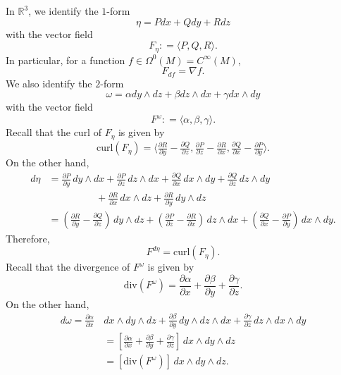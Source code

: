 \documentclass{ximera}
\begin{document}
\begin{example}
In $\mathbb{R}^3$, we identify the $1$-form
\[  \eta =   P   dx +  Q  dy + R   dz       \]
with the vector field 
\[  F_{\eta} : =   \langle P, Q, R \rangle    .  \]
In particular, for a function $f \in \Omega ^0 (M) = C^{\infty}(M)$,  
\[   F_{df}  = \nabla f .               \]
We also identify the $2$-form
\[  \omega =  \alpha dy \wedge dz  + \beta dz \wedge dx  + \gamma dx \wedge dy                        \]
with the vector field 
\[   F^{\omega} :  = \langle \alpha  , \beta , \gamma \rangle   .      \]
Recall that the curl of $F_{\eta}$ is given by 
\[    \text{curl} (F_{\eta}) = \langle \tfrac{\partial R}{\partial y} - \tfrac{\partial Q}{\partial z} , \tfrac{\partial P}{\partial z} - \tfrac{\partial R}{\partial x} , \tfrac{\partial Q}{\partial x}  - \tfrac{\partial P}{\partial y} \rangle .          \]
On the other hand, 
\begin{align*}
     d \eta & = \tfrac{\partial P }{\partial y}  \, dy \wedge dx + \tfrac{\partial P }{\partial z} \, dz \wedge dx  + \tfrac{\partial Q }{\partial x} \, dx \wedge dy + \tfrac{\partial Q }{\partial z} \, dz \wedge dy   \\
     &  \,\,\,\,\,\,\,\,\,\,\,\,\,\,\,\,\,\,\,\,\,\,\,\,\,\,\,\,\,     + \tfrac{\partial R }{\partial x} \, dx \wedge dz  + \tfrac{\partial R }{\partial y} \, dy \wedge dz \\
     & = \left(  \tfrac{\partial R }{\partial y} -  \tfrac{\partial Q }{\partial z}  \right) \, dy \wedge dz + \left(  \tfrac{\partial P }{\partial z} -  \tfrac{\partial R }{\partial x}  \right)\, dz \wedge dx + \left(  \tfrac{\partial Q }{\partial x} -  \tfrac{\partial P }{\partial y}  \right)\, dx \wedge dy  .
\end{align*}
Therefore, 
\[    F^{d \eta } = \text{curl}(F_{\eta}).                      \]
Recall that the divergence of $F^{\omega}$ is given by 
\[     \text{div} (F^{\omega}) =  \frac{\partial \alpha}{\partial x} +   \frac{\partial \beta }{\partial y }  +  \frac{\partial \gamma }{\partial z}    .            \]
On the other hand, 
\begin{align*}
    d \omega   = \frac{\partial \alpha}{\partial x } \, & dx \wedge dy \wedge dz + \frac{\partial \beta }{\partial y } \, dy \wedge dz \wedge dx +\frac{\partial \gamma }{\partial z } \, dz \wedge dx \wedge dy \\
    & = \left[ \frac{\partial \alpha}{\partial x } + \frac{\partial \beta }{\partial y } +\frac{\partial \gamma }{\partial z }         \right] \, dx \wedge dy \wedge dz \\
    & = [\text{div} (F^{\omega})] \, dx \wedge dy \wedge dz . 
\end{align*}
\end{example}
\end{document}

